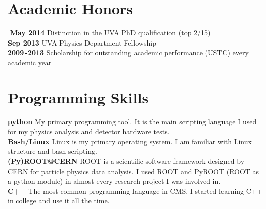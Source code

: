\documentclass[10pt]{article} %
\begin{document}
\section{Academic Honors}
\begin{tabbing} %
\hspace{2cm} \= \kill
\textbf{May 2014} \> Distinction in the UVA PhD qualification (top 2/15) \\
\textbf{Sep 2013} \> UVA Physics Department Fellowship \\
\textbf{2009\,-2013} \> Scholarship for outstanding academic performance (USTC) every academic year\\
\end{tabbing}

\section{Programming Skills}
\textbf{python}
\small{
My primary programming tool. It is the main scripting language I used for my physics analysis and detector hardware tests.
}\\


\textbf{Bash/Linux}
\small{
Linux is my primary operating system. I am familiar with Linux structure and bash scripting.
}\\


\textbf{(Py)ROOT@CERN}
\small{
ROOT is a scientific software framework designed by CERN for particle physics data analysis. I used ROOT and PyROOT (ROOT as a python module) in almost every research project I was involved in.
}\\


\textbf{C++}
\small{
The most common programming language in CMS. I started learning C++ in college and use it all the time.
}
\end{document}
